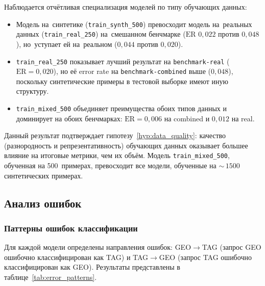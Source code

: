 Наблюдается отчётливая специализация моделей по типу обучающих данных:
\begin{itemize}
    \item Модель на~синтетике (\texttt{train\_synth\_500}) превосходит модель на~реальных данных (\texttt{train\_real\_250}) на~смешанном бенчмарке ($\mathrm{ER}$ $0{,}022$ против $0{,}048$), но~уступает ей на~реальном ($0{,}044$ против $0{,}020$).
    \item \texttt{train\_real\_250} показывает лучший результат на \texttt{benchmark-real} ($\mathrm{ER} = 0{,}020$), но её error rate на \texttt{benchmark-combined} выше ($0{,}048$), поскольку синтетические примеры в тестовой выборке имеют иную структуру.
    \item \texttt{train\_mixed\_500} объединяет преимущества обоих типов данных и доминирует на обоих бенчмарках: $\mathrm{ER} = 0{,}006$ на combined и $0{,}012$ на real.
\end{itemize}

Данный результат подтверждает гипотезу~\ref{hyp:data_quality}: качество (разнородность и репрезентативность) обучающих данных оказывает большее влияние на итоговые метрики, чем их объём. Модель \texttt{train\_mixed\_500}, обученная на 500~примерах, превосходит все модели, обученные на ${\sim}\,1500$ синтетических примерах.

\subsection{Анализ ошибок} \label{subsec:error_analysis}

\subsubsection{Паттерны ошибок классификации}

Для каждой модели определены направления ошибок: GEO$\to$TAG (запрос GEO ошибочно классифицирован как TAG) и TAG$\to$GEO (запрос TAG ошибочно классифицирован как GEO). Результаты представлены в таблице~\ref{tab:error_patterns}.

